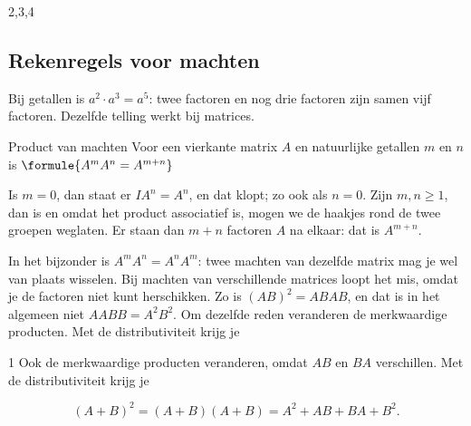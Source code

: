 \begin{alleenvoor}{2,3,4}

\begin{oefeningen}
\end{oefeningen}

\subsection{Rekenregels voor machten}

Bij getallen is $a^2 \cdot a^3 = a^5$: twee factoren en nog drie factoren zijn samen vijf factoren. Dezelfde telling werkt bij matrices.

\begin{theorie}
\begin{stelling}{Product van machten}
Voor een vierkante matrix $A$ en natuurlijke getallen $m$ en $n$ is \qquad $\formule{A^m A^n = A^{m+n}}$
\end{stelling}

\begin{bewijs}
Is $m = 0$, dan staat er $IA^n = A^n$, en dat klopt; zo ook als $n = 0$. Zijn $m, n \geqslant 1$, dan is
en omdat het product associatief is, mogen we de haakjes rond de twee groepen weglaten. Er staan dan $m + n$ factoren $A$ na elkaar: dat is $A^{m+n}$.
\end{bewijs}
\end{theorie}

In het bijzonder is $A^m A^n = A^n A^m$: twee machten van dezelfde matrix mag je wel van plaats wisselen. Bij machten van verschillende matrices loopt het mis, omdat je de factoren niet kunt herschikken. Zo is $(AB)^2 = ABAB$, en dat is in het algemeen niet $AABB = A^2B^2$. Om dezelfde reden veranderen de merkwaardige producten. Met de distributiviteit krijg je
\end{alleenvoor}
\begin{alleenvoor}{1}
Ook de merkwaardige producten veranderen, omdat $AB$ en $BA$ verschillen. Met de distributiviteit krijg je
\end{alleenvoor}
\[ (A + B)^2 = (A + B)(A + B) = A^2 + AB + BA + B^2 . \]
